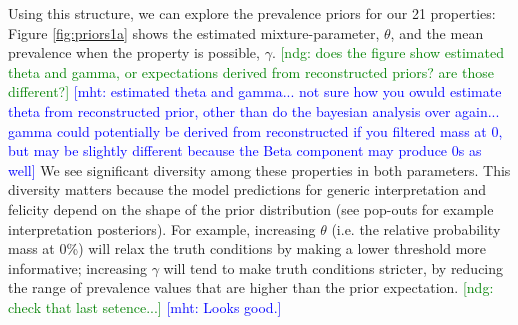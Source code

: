 \documentclass[10pt,letterpaper]{article}
\newcommand{\ndg}[1]{\textcolor{Green}{[ndg: #1]}}
\newcommand{\mht}[1]{\textcolor{Blue}{[mht: #1]}}
\begin{document}

Using this structure, we can explore the prevalence priors for our 21 properties:
Figure \ref{fig:priors1a} shows the estimated mixture-parameter, $\theta$, and the mean prevalence when the property is possible, $\gamma$. \ndg{does the figure show estimated theta and gamma, or expectations derived from reconstructed priors? are those different?} \mht{estimated theta and gamma... not sure how you owuld estimate theta from reconstructed prior, other than do the bayesian analysis over again... gamma could potentially be derived from reconstructed if you filtered mass at 0, but may be slightly different because the Beta component may produce 0s as well}
We see significant diversity among these properties in both parameters. This diversity matters because the model predictions for generic interpretation and felicity depend on the shape of the prior distribution (see pop-outs for example interpretation posteriors).
For example, increasing $\theta$ (i.e. the relative probability mass at 0\%) will relax the truth conditions by making a lower threshold more informative; increasing $\gamma$ will tend to make truth conditions stricter, by reducing the range of prevalence values that are higher than the prior expectation. \ndg{check that last setence...} \mht{Looks good.}
 
\end{document}
